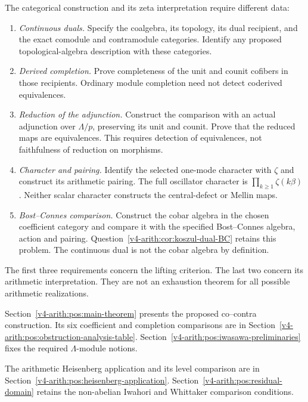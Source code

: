 \begin{remark}
\label{v4-arith:pos:rem:open-sub-items}
The categorical construction and its zeta interpretation require
different data:
\begin{enumerate}
\item \emph{Continuous duals.} Specify the coalgebra, its topology,
its dual recipient, and the exact comodule and contramodule
categories. Identify any proposed topological-algebra description
with these categories.
\item \emph{Derived completion.} Prove completeness of the unit
and counit cofibers in those recipients. Ordinary module
completion need not detect coderived equivalences.
\item \emph{Reduction of the adjunction.} Construct the comparison
with an actual adjunction over \(\Lambda/p\), preserving its
unit and counit. Prove that the reduced maps are equivalences.
This requires detection of equivalences, not faithfulness of
reduction on morphisms.
\item \emph{Character and pairing.} Identify the selected
one-mode character with \(\zeta\) and construct its arithmetic
pairing. The full oscillator character is
\(\prod_{k\ge1}\zeta(k\beta)\). Neither scalar character
constructs the central-defect or Mellin maps.
\item \emph{Bost--Connes comparison.} Construct the cobar algebra
in the chosen coefficient category and compare it with the
specified Bost--Connes algebra, action and pairing.
Question~\ref{v4-arith:cor:koszul-dual-BC} retains this problem.
The continuous dual is not the cobar algebra by definition.
\end{enumerate}
The first three requirements concern the lifting criterion.
The last two concern its arithmetic interpretation.
They are not an exhaustion theorem for all possible arithmetic
realizations.
\end{remark}

Section~\ref{v4-arith:pos:main-theorem} presents the proposed
co--contra construction. Its six coefficient and completion
comparisons are in Section~\ref{v4-arith:pos:obstruction-analysis-table}.
Section~\ref{v4-arith:pos:iwasawa-preliminaries} fixes the required
\(\Lambda\)-module notions.

The arithmetic Heisenberg application and its level comparison
are in Section~\ref{v4-arith:pos:heisenberg-application}.
Section~\ref{v4-arith:pos:residual-domain} retains the non-abelian
Iwahori and Whittaker comparison conditions.

